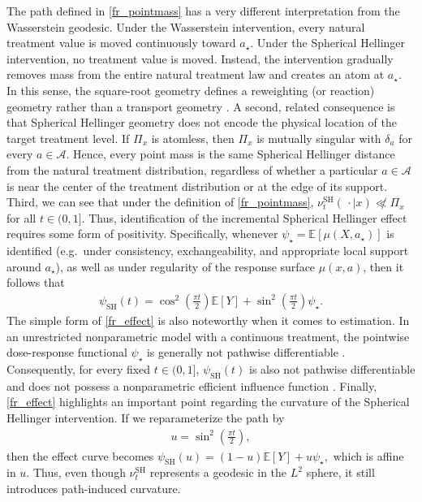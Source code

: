 \documentclass[11pt,twoside]{article}
\theoremstyle{definition}
\theoremstyle{remark}
\begin{document}
The path defined in \cref{fr_pointmass} has a very different interpretation from the Wasserstein geodesic. Under the Wasserstein intervention, every natural treatment value is moved continuously toward $a_\star$. Under the Spherical Hellinger intervention, no treatment value is moved. Instead, the intervention gradually removes mass from the entire natural treatment law and creates an atom at $a_\star$. In this sense,  the square-root geometry defines a reweighting (or reaction) geometry rather than a transport geometry \citep{liero2016reaction}. A second, related consequence is that Spherical Hellinger geometry does not encode the physical location of the target treatment level. If $\Pi_x$ is atomless, then $\Pi_x$ is mutually singular with $\delta_a$ for every $a\in\mathcal{A}$. Hence, every point mass is the same Spherical Hellinger distance from the natural treatment distribution, regardless of whether a particular $a \in \mathcal{A}$ is near the center of the treatment distribution or at the edge of its support. Third, we can see that under the definition of \cref{fr_pointmass}, $\nu^{\mathrm{SH}}_t( \, \cdot \mid x) \not \ll \Pi_x$ for all $t \in (0, 1]$. Thus, identification of the incremental Spherical Hellinger effect requires some form of positivity. Specifically, whenever $\psi_\star = \mathbb{E}[\mu(X,a_\star)]$ is identified (e.g.\ under consistency, exchangeability, and appropriate local support around $a_\star$), as well as under regularity of the response
surface $\mu(x, a)$, then it follows that
\begin{align} \label{fr_effect}
    \psi_{\mathrm{SH}}(t) =  \cos^2\left(\frac{\pi t}{2}\right)\mathbb{E}[Y] + \sin^2\left(\frac{\pi t}{2}\right)\psi_\star.
\end{align}
The simple form of \cref{fr_effect} is also noteworthy when it comes to estimation. In an unrestricted nonparametric model with a continuous treatment, the pointwise dose-response functional $\psi_\star$ is generally not pathwise differentiable
\citep{diaz2013targeted, kennedy2017cte}. Consequently, for every fixed $t\in(0,1]$, $\psi_{\mathrm{SH}}(t)$ is also not pathwise differentiable and does not possess a nonparametric efficient influence function \citep{bickel1998efficient,van2000asymptotic}. Finally, \cref{fr_effect} highlights an important point regarding the curvature of the Spherical Hellinger intervention. If we reparameterize the path by
\begin{align*}
    u = \sin^2\left(\frac{\pi t}{2}\right),
\end{align*}
then the effect curve becomes $\psi_{\mathrm{SH}}(u) = (1-u)\mathbb{E}[Y]+u\psi_\star,$ which is affine in $u$. Thus, even though $\nu^{\mathrm{SH}}_t$ represents a geodesic in the $L^2$ sphere, it still introduces path-induced curvature. 
\end{document}
